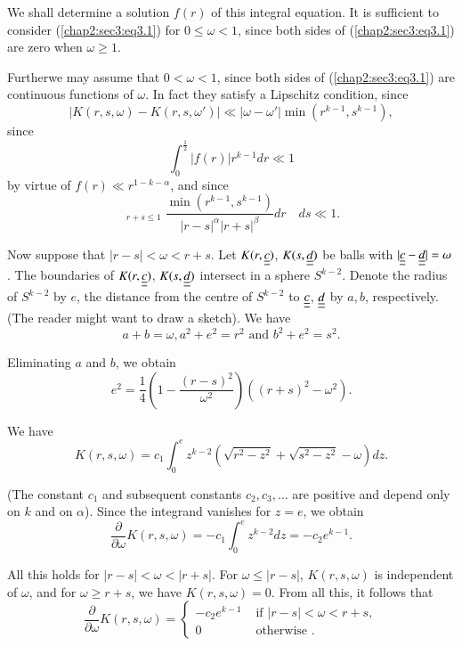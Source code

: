 We shall determine a solution $f(r)$ of this integral equation. It is sufficient to consider (\ref{chap2:sec3:eq3.1}) for $0 \leq \omega < 1$, since both sides of (\ref{chap2:sec3:eq3.1}) are zero when $\omega \geq 1$.

Further\pageoriginale we may assume that $0 < \omega < 1$, since both sides of (\ref{chap2:sec3:eq3.1}) are continuous functions of $\omega$. In fact they satisfy a Lipschitz condition, since
\begin{equation*}
|K(r, s, \omega) - K(r, s, \omega')| \ll |\omega - \omega'| \min (r^{k-1}, s^{k-1}),\tag{3.2}\label{chap2:sec3:eq3.2}
\end{equation*}
since
\begin{equation*}
\int_{0}^{\frac{1}{2}} |f(r)| r^{k-1} dr \ll 1\tag{3.3}\label{chap2:sec3:eq3.3}
\end{equation*}
by virtue of $f(r) \ll r^{1-k-\alpha}$, and since
\begin{equation*}
\mathop{\int_{0}^{1} \int_{0}^{1}}_{r+s \leq 1} \frac{\min (r^{k-1}, s^{k-1})}{|r-s|^{\alpha} |r+s|^{\beta}} dr \quad ds \ll 1.\tag{3.4}\label{chap2:sec3:eq3.4}
\end{equation*}

Now suppose that $|r-s| < \omega < r+s$. Let $K(r, \underline{\underline{c}})$, $K(s, \underline{\underline{d}})$ be balls with $|\underline{\underline{c}} - \underline{\underline{d}}| = \omega$. The boundaries of $K(r, \underline{\underline{c}})$, $K(s, \underline{\underline{d}})$ intersect in a sphere $S^{k-2}$. Denote the radius of $S^{k-2}$ by $e$, the distance from the centre of $S^{k-2}$ to $\underline{\underline{c}}$, $\underline{\underline{d}}$ by $a, b$, respectively. (The reader might want to draw a sketch). We have
$$
a+b = \omega, a^{2} + e^{2} = r^{2} \text{ and } b^{2} + e^{2} = s^{2}.
$$

Eliminating $a$ and $b$, we obtain
$$
e^{2} = \frac{1}{4} (1 -\frac{(r-s)^{2}}{\omega^{2}}) ((r+s)^{2} - \omega^{2}).
$$

We have
$$
K(r, s, \omega) = c_{1} \int_{0}^{e} z^{k-2} (\sqrt{r^{2} - z^{2}} + \sqrt{s^{2} - z^{2}} - \omega)dz.
$$

(The constant $c_{1}$ and subsequent constants $c_{2}, c_{3}, \ldots$ are positive and depend only on $k$ and on $\alpha$). Since the integrand vanishes for $z = e$, we obtain
$$
\frac{\partial}{\partial \omega} K(r, s, \omega) = -c_{1} \int_{0}^{e} z^{k-2} dz = -c_{2} e^{k-1}.
$$\pageoriginale

All this holds for $|r-s| < \omega < |r+s|$. For $\omega \leq |r-s|$, $K(r, s, \omega)$ is independent of $\omega$, and for $\omega \geq r+s$, we have $K(r, s, \omega) = 0$. From all this, it follows that 
\begin{equation*}
\frac{\partial}{\partial \omega} K(r, s, \omega) =
 \begin{cases}
  -c_{2} e^{k-1} & \text{ if } |r-s|< \omega < r+s,\\
   0 & \text{ otherwise }.
 \end{cases}
\end{equation*}

